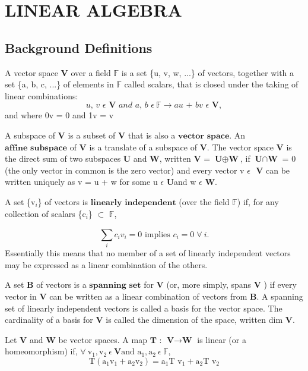 \section{LINEAR ALGEBRA}
\subsection{Background Definitions}
A vector space $\textbf{V}$ over a field $\mathbb{F}$ is a set \{u, v, w, ...\} of vectors, 
together with a set \{a, b, c, ...\} of elements in $\mathbb{F}$ called scalars,
that is closed under the taking of linear combinations:
\begin{equation}
    \textit{u, v } \epsilon \textbf{ V} \textit{ and a, b } \epsilon \: \mathbb{F} \rightarrow \textit{au + bv } \epsilon \textbf{ V},
\end{equation}
and where 0v = 0 and 1v = v

A subspace of $\textbf{V}$ is a subset of $\textbf{V}$ that is also a $\textbf{vector space}$. An $\textbf{affine subspace}$
of $\textbf{V}$ is a translate of a subspace of $\textbf{V}$. The vector space $\textbf{V}$ is the direct sum of
two subspaces $\textbf{U}$ and $\textbf{W}$, written $\textbf{V}$ = $\textbf{U} \oplus \textbf{W}$, 
if $\textbf{U} \cap \textbf{W}$ = 0 (the only vector in common is the 
zero vector) and every vector v $\epsilon$ $\textbf{ V}$ can be written uniquely as
v = u + w for some u $\epsilon \textbf{ U}$and w $\epsilon \textbf{ W}$.

A set \{v$_i$\} of vectors is $\textbf{linearly independent}$ (over the field $\mathbb{F}$) if, for any
collection of scalars \{c$_i$\} $\subset$ $\mathbb{F}$,

\begin{equation}
    \sum_{i}^{}c_i v_i = 0 \text{ implies }
    c_i = 0 \; \forall \: i.
\end{equation}
Essentially this means that no member of a set of linearly independent vectors may
be expressed as a linear combination of the others.

A set $\textbf{B}$ of vectors is a $\textbf{spanning set}$ for $\textbf{V}$ (or, more simply, spans $\textbf{V}$ ) if every
vector in $\textbf{V}$ can be written as a linear combination of vectors from $\textbf{B}$. A spanning
set of linearly independent vectors is called a basis for the vector space. The cardinality of a basis
for $\textbf{V}$ is called the dimension of the space, written dim $\textbf{V}$.

Let $\textbf{V}$ and $\textbf{W}$ be vector spaces. A map $\textbf{T}$ : $\textbf{V} \rightarrow \textbf{W}$ is linear (or a homeomorphism)
if, $\forall \: \text{v}_1 , \text{v}_2 \: \epsilon \: \textbf{V}  \text{and  a}_1 , \text{a}_2 \: \epsilon \: \mathbb{F}$,
\begin{equation}
    \text{T}(\text{a}_1 \text{v}_1 + \text{a}_2 \text{v}_2) = \text{a}_1  \text{T v}_1 + \text{a}_2 \text{T v}_2
\end{equation}

